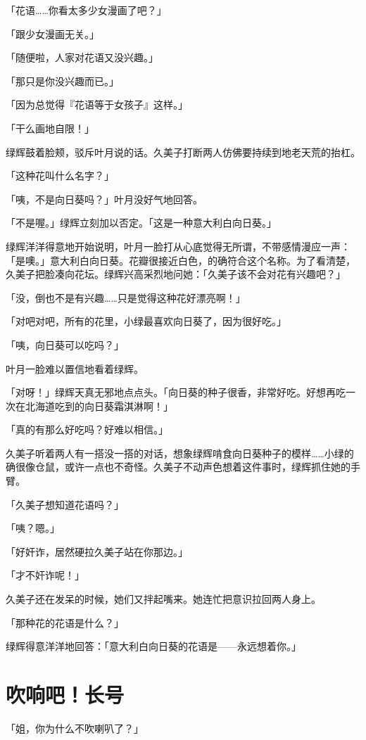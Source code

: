 \documentclass[UTF8]{ctexart}
\begin{document}
    「花语……你看太多少女漫画了吧？」 

    「跟少女漫画无关。」 

    「随便啦，人家对花语又没兴趣。」 

    「那只是你没兴趣而已。」 

    「因为总觉得『花语等于女孩子』这样。」 

    「干么画地自限！」 

    绿辉鼓着脸颊，驳斥叶月说的话。久美子打断两人仿佛要持续到地老天荒的抬杠。 

    「这种花叫什么名字？」 

    「咦，不是向日葵吗？」叶月没好气地回答。 

    「不是喔。」绿辉立刻加以否定。「这是一种意大利白向日葵。」 

    绿辉洋洋得意地开始说明，叶月一脸打从心底觉得无所谓，不带感情漫应一声：「是噢。」意大利白向日葵。花瓣很接近白色，的确符合这个名称。为了看清楚，久美子把脸凑向花坛。绿辉兴高采烈地问她：「久美子该不会对花有兴趣吧？」 

    「没，倒也不是有兴趣……只是觉得这种花好漂亮啊！」 

    「对吧对吧，所有的花里，小绿最喜欢向日葵了，因为很好吃。」 

    「咦，向日葵可以吃吗？」 

    叶月一脸难以置信地看着绿辉。 

    「对呀！」绿辉天真无邪地点点头。「向日葵的种子很香，非常好吃。好想再吃一次在北海道吃到的向日葵霜淇淋啊！」 

    「真的有那么好吃吗？好难以相信。」 

    久美子听着两人有一搭没一搭的对话，想象绿辉啃食向日葵种子的模样……小绿的确很像仓鼠，或许一点也不奇怪。久美子不动声色想着这件事时，绿辉抓住她的手臂。 

    「久美子想知道花语吗？」 

    「咦？嗯。」 

    「好奸诈，居然硬拉久美子站在你那边。」 

    「才不奸诈呢！」 

    久美子还在发呆的时候，她们又拌起嘴来。她连忙把意识拉回两人身上。 

    「那种花的花语是什么？」 

    绿辉得意洋洋地回答：「意大利白向日葵的花语是——永远想着你。」   

    \section{吹响吧！长号} 
    「姐，你为什么不吹喇叭了？」 
\end{document}
